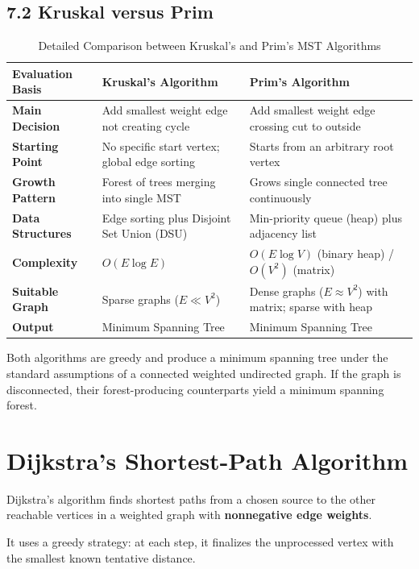 \subsection{7.2 Kruskal versus Prim}

\begin{table}[htbp]
\centering
\caption{Detailed Comparison between Kruskal's and Prim's MST Algorithms}
\label{tab:kruskal_vs_prim}
\begin{tabularx}{\textwidth}{p{3.5cm} X X}
\toprule
\textbf{Evaluation Basis} & \textbf{Kruskal's Algorithm} & \textbf{Prim's Algorithm} \\
\midrule
\textbf{Main Decision} & Add smallest weight edge not creating cycle & Add smallest weight edge crossing cut to outside \\
\textbf{Starting Point} & No specific start vertex; global edge sorting & Starts from an arbitrary root vertex \\
\textbf{Growth Pattern} & Forest of trees merging into single MST & Grows single connected tree continuously \\
\textbf{Data Structures} & Edge sorting plus Disjoint Set Union (DSU) & Min-priority queue (heap) plus adjacency list \\
\textbf{Complexity} & $O(E \log E)$ & $O(E \log V)$ (binary heap) / $O(V^2)$ (matrix) \\
\textbf{Suitable Graph} & Sparse graphs ($E \ll V^2$) & Dense graphs ($E \approx V^2$) with matrix; sparse with heap \\
\textbf{Output} & Minimum Spanning Tree & Minimum Spanning Tree \\
\bottomrule
\end{tabularx}
\end{table}

Both algorithms are greedy and produce a minimum spanning tree under the standard assumptions of a connected weighted undirected graph. If the graph is disconnected, their forest-producing counterparts yield a minimum spanning forest.

\section{Dijkstra's Shortest-Path Algorithm}

Dijkstra's algorithm finds shortest paths from a chosen source to the other reachable vertices in a weighted graph with \textbf{nonnegative edge weights}.

It uses a greedy strategy: at each step, it finalizes the unprocessed vertex with the smallest known tentative distance.

